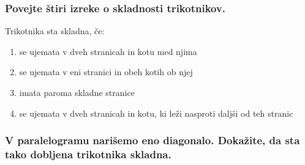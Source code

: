 \documentclass{article}
\begin{document}
\subsubsection*{Povejte štiri izreke o skladnosti trikotnikov.}

Trikotnika sta skladna, če:

\begin{enumerate}
  \item se ujemata v dveh stranicah in kotu med njima

  \item se ujemata v eni stranici in obeh kotih ob njej

  \item imata paroma skladne stranice

  \item se ujemata v dveh stranicah in kotu, ki leži nasproti daljši od teh stranic

\end{enumerate}

\subsubsection*{V paralelogramu narišemo eno diagonalo. Dokažite, da sta tako dobljena trikotnika skladna.}
\end{document}
